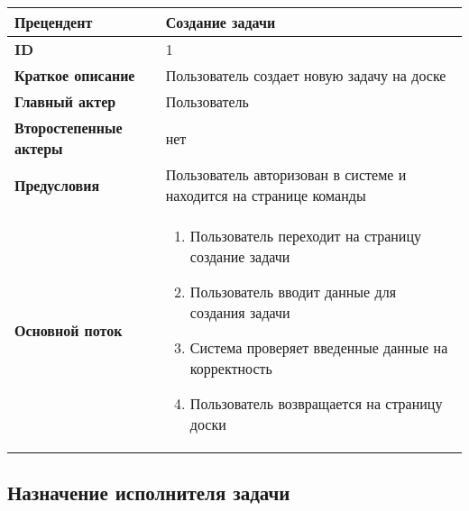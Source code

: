 \documentclass[14pt,a4paper]{extarticle}
\begin{document}
\begin{tabular}{|l|p{9cm}|}
	\hline
	\textbf{Прецендент}            & Создание задачи                                                    \\
	\hline
	\textbf{ID}                    & 1                                                                  \\
	\hline
	\textbf{Краткое описание}      & Пользователь создает новую задачу на доске                         \\
	\hline
	\textbf{Главный актер}         & Пользователь                                                       \\
	\hline
	\textbf{Второстепенные актеры} & нет                                                                \\
	\hline
	\textbf{Предусловия}           & Пользователь авторизован в системе и находится на странице команды \\
	\hline
	\textbf{Основной поток}        & \begin{enumerate}
		                                 \item Пользователь переходит на страницу создание задачи
		                                 \item Пользователь вводит данные для создания задачи
		                                 \item Система проверяет введенные данные на корректность
		                                 \item Пользователь возвращается на страницу доски
	                                 \end{enumerate}            \\
	\hline
\end{tabular}

\subsection{Назначение исполнителя задачи}
\end{document}
